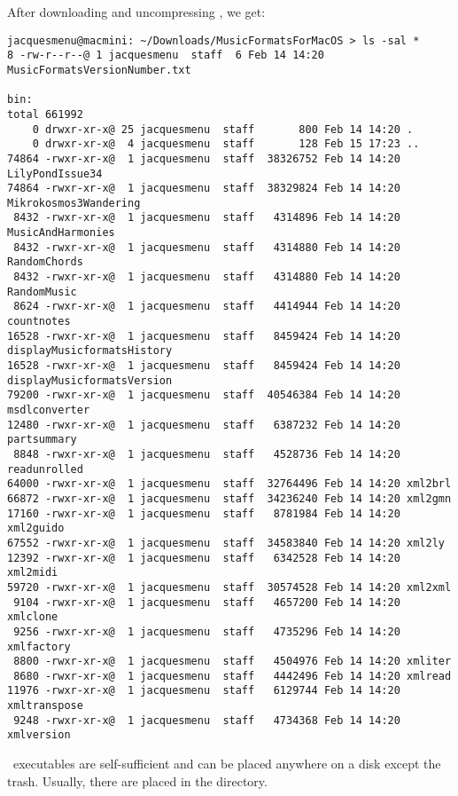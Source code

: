 After downloading and uncompressing , we get:
\begin{lstlisting}[language=Terminal]
jacquesmenu@macmini: ~/Downloads/MusicFormatsForMacOS > ls -sal *
8 -rw-r--r--@ 1 jacquesmenu  staff  6 Feb 14 14:20 MusicFormatsVersionNumber.txt

bin:
total 661992
    0 drwxr-xr-x@ 25 jacquesmenu  staff       800 Feb 14 14:20 .
    0 drwxr-xr-x@  4 jacquesmenu  staff       128 Feb 15 17:23 ..
74864 -rwxr-xr-x@  1 jacquesmenu  staff  38326752 Feb 14 14:20 LilyPondIssue34
74864 -rwxr-xr-x@  1 jacquesmenu  staff  38329824 Feb 14 14:20 Mikrokosmos3Wandering
 8432 -rwxr-xr-x@  1 jacquesmenu  staff   4314896 Feb 14 14:20 MusicAndHarmonies
 8432 -rwxr-xr-x@  1 jacquesmenu  staff   4314880 Feb 14 14:20 RandomChords
 8432 -rwxr-xr-x@  1 jacquesmenu  staff   4314880 Feb 14 14:20 RandomMusic
 8624 -rwxr-xr-x@  1 jacquesmenu  staff   4414944 Feb 14 14:20 countnotes
16528 -rwxr-xr-x@  1 jacquesmenu  staff   8459424 Feb 14 14:20 displayMusicformatsHistory
16528 -rwxr-xr-x@  1 jacquesmenu  staff   8459424 Feb 14 14:20 displayMusicformatsVersion
79200 -rwxr-xr-x@  1 jacquesmenu  staff  40546384 Feb 14 14:20 msdlconverter
12480 -rwxr-xr-x@  1 jacquesmenu  staff   6387232 Feb 14 14:20 partsummary
 8848 -rwxr-xr-x@  1 jacquesmenu  staff   4528736 Feb 14 14:20 readunrolled
64000 -rwxr-xr-x@  1 jacquesmenu  staff  32764496 Feb 14 14:20 xml2brl
66872 -rwxr-xr-x@  1 jacquesmenu  staff  34236240 Feb 14 14:20 xml2gmn
17160 -rwxr-xr-x@  1 jacquesmenu  staff   8781984 Feb 14 14:20 xml2guido
67552 -rwxr-xr-x@  1 jacquesmenu  staff  34583840 Feb 14 14:20 xml2ly
12392 -rwxr-xr-x@  1 jacquesmenu  staff   6342528 Feb 14 14:20 xml2midi
59720 -rwxr-xr-x@  1 jacquesmenu  staff  30574528 Feb 14 14:20 xml2xml
 9104 -rwxr-xr-x@  1 jacquesmenu  staff   4657200 Feb 14 14:20 xmlclone
 9256 -rwxr-xr-x@  1 jacquesmenu  staff   4735296 Feb 14 14:20 xmlfactory
 8800 -rwxr-xr-x@  1 jacquesmenu  staff   4504976 Feb 14 14:20 xmliter
 8680 -rwxr-xr-x@  1 jacquesmenu  staff   4442496 Feb 14 14:20 xmlread
11976 -rwxr-xr-x@  1 jacquesmenu  staff   6129744 Feb 14 14:20 xmltranspose
 9248 -rwxr-xr-x@  1 jacquesmenu  staff   4734368 Feb 14 14:20 xmlversion
\end{lstlisting}

\MacOS\ executables are self-sufficient and can be placed anywhere on a disk except the trash. Usually, there are placed in the  directory.


